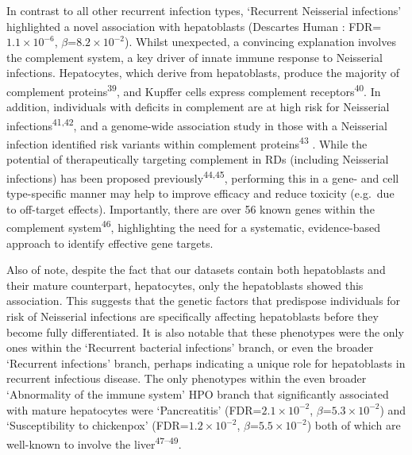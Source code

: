\documentclass[
]{report}
\begin{document}
In contrast to all other recurrent infection types, `Recurrent
Neisserial infections' highlighted a novel association with hepatoblasts
(Descartes Human : FDR=\(1.1 \times 10^{-6}\),
\(\beta\)=\(8.2 \times 10^{-2}\)). Whilst unexpected, a convincing
explanation involves the complement system, a key driver of innate
immune response to Neisserial infections. Hepatocytes, which derive from
hepatoblasts, produce the majority of complement
proteins\textsuperscript{39}, and Kupffer cells express complement
receptors\textsuperscript{40}. In addition, individuals with deficits in
complement are at high risk for Neisserial
infections\textsuperscript{41,42}, and a genome-wide association study
in those with a Neisserial infection identified risk variants within
complement proteins\textsuperscript{43} . While the potential of
therapeutically targeting complement in RDs (including Neisserial
infections) has been proposed previously\textsuperscript{44,45},
performing this in a gene- and cell type-specific manner may help to
improve efficacy and reduce toxicity (e.g.~due to off-target effects).
Importantly, there are over 56 known genes within the complement
system\textsuperscript{46}, highlighting the need for a systematic,
evidence-based approach to identify effective gene targets.

Also of note, despite the fact that our datasets contain both
hepatoblasts and their mature counterpart, hepatocytes, only the
hepatoblasts showed this association. This suggests that the genetic
factors that predispose individuals for risk of Neisserial infections
are specifically affecting hepatoblasts before they become fully
differentiated. It is also notable that these phenotypes were the only
ones within the `Recurrent bacterial infections' branch, or even the
broader `Recurrent infections' branch, perhaps indicating a unique role
for hepatoblasts in recurrent infectious disease. The only phenotypes
within the even broader `Abnormality of the immune system' HPO branch
that significantly associated with mature hepatocytes were
`Pancreatitis' (FDR=\(2.1 \times 10^{-2}\),
\(\beta\)=\(5.3 \times 10^{-2}\)) and `Susceptibility to chickenpox'
(FDR=\(1.2 \times 10^{-2}\), \(\beta\)=\(5.5 \times 10^{-2}\)) both of
which are well-known to involve the liver\textsuperscript{47--49}.
\end{document}
